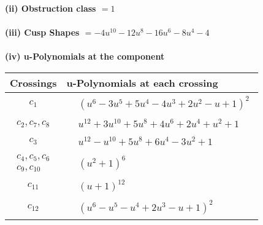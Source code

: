 \documentclass[1p]{elsarticle_modified}
\theoremstyle{definition}
\begin{document}
\flushleft \textbf{(ii) Obstruction class $= 1$}\\~\\
\flushleft \textbf{(iii) Cusp Shapes $= -4 u^{10}-12 u^8-16 u^6-8 u^4-4$}\\~\\
\newpage\renewcommand{\arraystretch}{1}
\flushleft \textbf{(iv) u-Polynomials at the component}\newline \\
\begin{tabular}{m{50pt}|m{274pt}}
Crossings & \hspace{64pt}u-Polynomials at each crossing \\
\hline $$\begin{aligned}c_{1}\end{aligned}$$&$\begin{aligned}
&(u^6-3 u^5+5 u^4-4 u^3+2 u^2- u+1)^2
\end{aligned}$\\
\hline $$\begin{aligned}c_{2},c_{7},c_{8}\end{aligned}$$&$\begin{aligned}
&u^{12}+3 u^{10}+5 u^8+4 u^6+2 u^4+u^2+1
\end{aligned}$\\
\hline $$\begin{aligned}c_{3}\end{aligned}$$&$\begin{aligned}
&u^{12}- u^{10}+5 u^8+6 u^4-3 u^2+1
\end{aligned}$\\
\hline $$\begin{aligned}c_{4},c_{5},c_{6}\\c_{9},c_{10}\end{aligned}$$&$\begin{aligned}
&(u^2+1)^6
\end{aligned}$\\
\hline $$\begin{aligned}c_{11}\end{aligned}$$&$\begin{aligned}
&(u+1)^{12}
\end{aligned}$\\
\hline $$\begin{aligned}c_{12}\end{aligned}$$&$\begin{aligned}
&(u^6- u^5- u^4+2 u^3- u+1)^2
\end{aligned}$\\
\hline
\end{tabular}\\~\\
\end{document}

